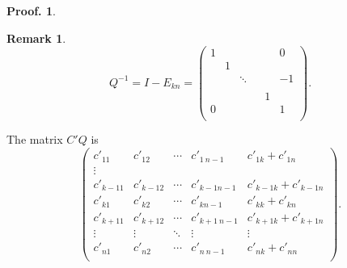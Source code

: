 \documentclass{article}
\theoremstyle{plain}
\theoremstyle{definition}
\newtheorem{rem}[thm]{Remark}
\newtheorem{pof}[thm]{Proof.}
\begin{document}
\begin{pof}
% 


    \begin{rem}

    $$Q^{-1}=I-E_{kn}=\begin{pmatrix}
    1 &  & & &  & 0 \\
    & 1 &  &      &  &  \\
    &  & \ddots & &  & -1 \\
    &  &        & &  &  \\
    &  & & & 1 &  \\
    0 &  & & &  & 1 \\
    \end{pmatrix}.$$

    The matrix $C'Q$ is
    $$\begin{pmatrix}
    c'_{11}     & c'_{12} & \cdots     & c'_{1\ n-1} & c'_{1k}+c'_{1n} \\
    \vdots \\
    c'_{k-11}     & c'_{k-1 2}           & \cdots     & c'_{k-1 n-1} & c'_{k-1k}+c'_{k-1n} \\
    c'_{k1} & c'_{k2} &\cdots      & c'_{kn-1} & c'_{kk}+c'_{kn}\\
    c'_{k+11}     & c'_{k+12}           & \cdots     & c'_{k+1\ n-1} & c'_{k+1k}+c'_{k+1n} \\
    \vdots              & \vdots & \ddots              & \vdots & \vdots \\
    c'_{n1}             & c'_{n2} & \cdots             & c'_{n\ n-1} & c'_{nk}+c'_{nn} \\
    \end{pmatrix}.
    $$
    \end{rem}

\begin{comment}


\begin{rmk}
        (i) is immediate from Definition~\ref{m_rooted} and the observation that   
        $$Q^{-1}=I-E_{kn}=\begin{pmatrix}
        1 &  & & &  & 0 \\
         & 1 &  &      &  &  \\
         &  & \ddots & &  & -1 \\
         &  &        & &  &  \\
          &  & & & 1 &  \\
        0 &  & & &  & 1 \\
        \end{pmatrix},$$
\end{rmk}
 \end{comment}   




\end{pof}
\end{document}
